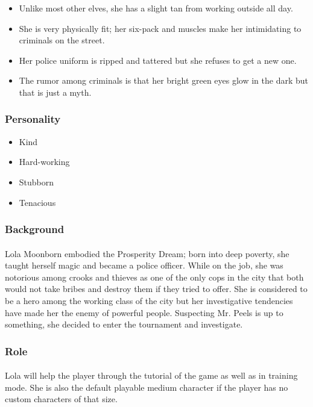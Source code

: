 \begin{itemize}
    \item Unlike most other elves, she has a slight tan from working outside all day.
    \item She is very physically fit; her six-pack and muscles make her intimidating to criminals on the street.
    \item Her police uniform is ripped and tattered but she refuses to get a new one.
    \item The rumor among criminals is that her bright green eyes glow in the dark but that is just a myth.
\end{itemize}

\subsubsection{Personality}

\begin{itemize}
    \item Kind
    \item Hard-working
    \item Stubborn
    \item Tenacious
\end{itemize}

\subsubsection{Background}

\paragraph{} Lola Moonborn embodied the Prosperity Dream; born into deep poverty, she taught herself magic and became a police officer. While on the job, she was notorious among crooks and thieves as one of the only cops in the city that both would not take bribes and destroy them if they tried to offer. She is considered to be a hero among the working class of the city but her investigative tendencies have made her the enemy of powerful people. Suspecting Mr. Peels is up to something, she decided to enter the tournament and investigate.

\subsubsection{Role}

\paragraph{} Lola will help the player through the tutorial of the game as well as in training mode. She is also the default playable medium character if the player has no custom characters of that size.

